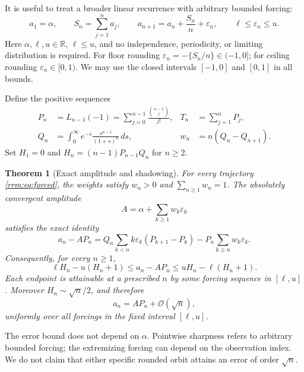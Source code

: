 \documentclass[11pt]{article}
\newtheorem{theorem}{Theorem}[section]
\theoremstyle{remark}\newtheorem{remark}[theorem]{Remark}
\newcommand{\eps}{\varepsilon}
\newcommand{\OO}{\mathcal O}
\newcommand{\R}{\mathbb R}
\begin{document}
It is useful to treat a broader linear recurrence with arbitrary bounded forcing:
\begin{equation}\label{rrm:eq:forced}
 a_1=\alpha,\qquad S_n=\sum_{j=1}^n a_j,\qquad
 a_{n+1}=a_n+\frac{S_n}{n}+\eps_n,\qquad \ell\le\eps_n\le u.
\end{equation}
Here $\alpha,\ell,u\in\R$, $\ell\le u$, and no independence, periodicity, or limiting distribution is required. For floor rounding $\eps_n=-\{S_n/n\}\in(-1,0]$; for ceiling rounding $\eps_n\in[0,1)$. We may use the closed intervals $[-1,0]$ and $[0,1]$ in all bounds.

Define the positive sequences
\begin{align}
 P_n&=L_{n-1}(-1)=\sum_{j=0}^{n-1}\frac{\binom{n-1}{j}}{j!},
 &T_n&=\sum_{j=1}^n P_j,\label{rrm:eq:P}\\
 Q_n&=\int_0^\infty e^{-s}\frac{s^{n-1}}{(1+s)^n}\,ds,
 &w_n&=n(Q_n-Q_{n+1}).\label{rrm:eq:Q}
\end{align}
Set $H_1=0$ and $H_n=(n-1)P_{n-1}Q_n$ for $n\ge2$.

\begin{theorem}[Exact amplitude and shadowing]\label{rrm:thm:shadow}
For every trajectory \eqref{rrm:eq:forced}, the weights satisfy $w_n>0$ and $\sum_{n\ge1}w_n=1$. The absolutely convergent amplitude
\begin{equation}\label{rrm:eq:A}
 A=\alpha+\sum_{k\ge1}w_k\eps_k
\end{equation}
satisfies the exact identity
\begin{equation}\label{rrm:eq:shadow}
 a_n-AP_n
 =Q_n\sum_{k<n}k\eps_k(P_{k+1}-P_k)
  -P_n\sum_{k\ge n}w_k\eps_k.
\end{equation}
Consequently, for every $n\ge1$,
\begin{equation}\label{rrm:eq:sharp}
 \ell H_n-u(H_n+1)\le a_n-AP_n
 \le uH_n-\ell(H_n+1).
\end{equation}
Each endpoint is attainable at a prescribed $n$ by some forcing sequence in $[\ell,u]$. Moreover $H_n\sim\sqrt n/2$, and therefore
\begin{equation}\label{rrm:eq:Osqrt}
 a_n=AP_n+\OO(\sqrt n),
\end{equation}
uniformly over all forcings in the fixed interval $[\ell,u]$.
\end{theorem}

The error bound does not depend on $\alpha$. Pointwise sharpness refers to arbitrary bounded forcing; the extremizing forcing can depend on the observation index. We do not claim that either specific rounded orbit attains an error of order $\sqrt n$.
\end{document}
